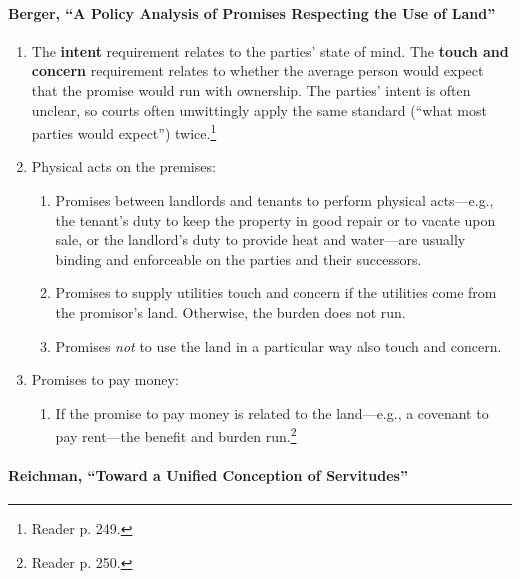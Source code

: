 \paragraph{Berger, ``A Policy Analysis of Promises Respecting the Use of 
Land''}

\begin{enumerate}
    \item The \textbf{intent} requirement relates to the parties' state of 
    mind. The \textbf{touch and concern} requirement relates to whether the 
    average person would expect that the promise would run with ownership. 
    The parties' intent is often unclear, so courts often unwittingly apply 
    the same standard (``what most parties would expect'') 
    twice.\footnote{Reader p. 249.}
    \item Physical acts on the premises:
    \begin{enumerate}
        \item Promises between landlords and tenants to perform physical 
        acts---e.g., the tenant's duty to keep the property in good repair or 
        to vacate upon sale, or the landlord's duty to provide heat and 
        water---are usually binding and enforceable on the parties and their 
        successors.
        \item Promises to supply utilities touch and concern if the utilities 
        come from the promisor's land. Otherwise, the burden does not run.
        \item Promises \emph{not} to use the land in a particular way also 
        touch and concern.
    \end{enumerate}
    \item Promises to pay money:
    \begin{enumerate}
        \item If the promise to pay money is related to the land---e.g., a 
        covenant to pay rent---the benefit and burden run.\footnote{Reader p. 
        250.}
    \end{enumerate}
\end{enumerate}

\paragraph{Reichman, ``Toward a Unified Conception of Servitudes''}

